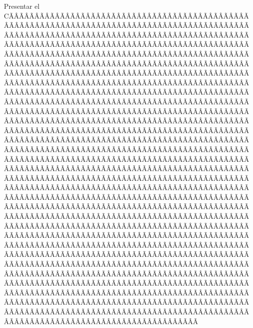 \begin{sumilla}
\begin{objetivosdelcurso}
\item  Presentar el CÃÂÃÂÃÂÃÂÃÂÃÂÃÂÃÂÃÂÃÂÃÂÃÂÃÂÃÂÃÂÃÂÃÂÃÂÃÂÃÂÃÂÃÂÃÂÃÂÃÂÃÂÃÂÃÂÃÂÃÂÃÂÃÂÃÂÃÂÃÂÃÂÃÂÃÂÃÂÃÂÃÂÃÂÃÂÃÂÃÂÃÂÃÂÃÂÃÂÃÂÃÂÃÂÃÂÃÂÃÂÃÂÃÂÃÂÃÂÃÂÃÂÃÂÃÂÃÂÃÂÃÂÃÂÃÂÃÂÃÂÃÂÃÂÃÂÃÂÃÂÃÂÃÂÃÂÃÂÃÂÃÂÃÂÃÂÃÂÃÂÃÂÃÂÃÂÃÂÃÂÃÂÃÂÃÂÃÂÃÂÃÂÃÂÃÂÃÂÃÂÃÂÃÂÃÂÃÂÃÂÃÂÃÂÃÂÃÂÃÂÃÂÃÂÃÂÃÂÃÂÃÂÃÂÃÂÃÂÃÂÃÂÃÂÃÂÃÂÃÂÃÂÃÂÃÂÃÂÃÂÃÂÃÂÃÂÃÂÃÂÃÂÃÂÃÂÃÂÃÂÃÂÃÂÃÂÃÂÃÂÃÂÃÂÃÂÃÂÃÂÃÂÃÂÃÂÃÂÃÂÃÂÃÂÃÂÃÂÃÂÃÂÃÂÃÂÃÂÃÂÃÂÃÂÃÂÃÂÃÂÃÂÃÂÃÂÃÂÃÂÃÂÃÂÃÂÃÂÃÂÃÂÃÂÃÂÃÂÃÂÃÂÃÂÃÂÃÂÃÂÃÂÃÂÃÂÃÂÃÂÃÂÃÂÃÂÃÂÃÂÃÂÃÂÃÂÃÂÃÂÃÂÃÂÃÂÃÂÃÂÃÂÃÂÃÂÃÂÃÂÃÂÃÂÃÂÃÂÃÂÃÂÃÂÃÂÃÂÃÂÃÂÃÂÃÂÃÂÃÂÃÂÃÂÃÂÃÂÃÂÃÂÃÂÃÂÃÂÃÂÃÂÃÂÃÂÃÂÃÂÃÂÃÂÃÂÃÂÃÂÃÂÃÂÃÂÃÂÃÂÃÂÃÂÃÂÃÂÃÂÃÂÃÂÃÂÃÂÃÂÃÂÃÂÃÂÃÂÃÂÃÂÃÂÃÂÃÂÃÂÃÂÃÂÃÂÃÂÃÂÃÂÃÂÃÂÃÂÃÂÃÂÃÂÃÂÃÂÃÂÃÂÃÂÃÂÃÂÃÂÃÂÃÂÃÂÃÂÃÂÃÂÃÂÃÂÃÂÃÂÃÂÃÂÃÂÃÂÃÂÃÂÃÂÃÂÃÂÃÂÃÂÃÂÃÂÃÂÃÂÃÂÃÂÃÂÃÂÃÂÃÂÃÂÃÂÃÂÃÂÃÂÃÂÃÂÃÂÃÂÃÂÃÂÃÂÃÂÃÂÃÂÃÂÃÂÃÂÃÂÃÂÃÂÃÂÃÂÃÂÃÂÃÂÃÂÃÂÃÂÃÂÃÂÃÂÃÂÃÂÃÂÃÂÃÂÃÂÃÂÃÂÃÂÃÂÃÂÃÂÃÂÃÂÃÂÃÂÃÂÃÂÃÂÃÂÃÂÃÂÃÂÃÂÃÂÃÂÃÂÃÂÃÂÃÂÃÂÃÂÃÂÃÂÃÂÃÂÃÂÃÂÃÂÃÂÃÂÃÂÃÂÃÂÃÂÃÂÃÂÃÂÃÂÃÂÃÂÃÂÃÂÃÂÃÂÃÂÃÂÃÂÃÂÃÂÃÂÃÂÃÂÃÂÃÂÃÂÃÂÃÂÃÂÃÂÃÂÃÂÃÂÃÂÃÂÃÂÃÂÃÂÃÂÃÂÃÂÃÂÃÂÃÂÃÂÃÂÃÂÃÂÃÂÃÂÃÂÃÂÃÂÃÂÃÂÃÂÃÂÃÂÃÂÃÂÃÂÃÂÃÂÃÂÃÂÃÂÃÂÃÂÃÂÃÂÃÂÃÂÃÂÃÂÃÂÃÂÃÂÃÂÃÂÃÂÃÂÃÂÃÂÃÂÃÂÃÂÃÂÃÂÃÂÃÂÃÂÃÂÃÂÃÂÃÂÃÂÃÂÃÂÃÂÃÂÃÂÃÂÃÂÃÂÃÂÃÂÃÂÃÂÃÂÃÂÃÂÃÂÃÂÃÂÃÂÃÂÃÂÃÂÃÂÃÂÃÂÃÂÃÂÃÂÃÂÃÂÃÂÃÂÃÂÃÂÃÂÃÂÃÂÃÂÃÂÃÂÃÂÃÂÃÂÃÂÃÂÃÂÃÂÃÂÃÂÃÂÃÂÃÂÃÂÃÂÃÂÃÂÃÂÃÂÃÂÃÂÃÂÃÂÃÂÃÂÃÂÃÂÃÂÃÂÃÂÃÂÃÂÃÂÃÂÃÂÃÂÃÂÃÂÃÂÃÂÃÂÃÂÃÂÃÂÃÂÃÂÃÂÃÂÃÂÃÂÃÂÃÂÃÂÃÂÃÂÃÂÃÂÃÂÃÂÃÂÃÂÃÂÃÂÃÂÃÂÃÂÃÂÃÂÃÂÃÂÃÂÃÂÃÂÃÂÃÂÃÂÃÂÃÂÃÂÃÂÃÂÃÂÃÂÃÂÃÂÃÂÃÂÃÂÃÂÃÂÃÂÃÂÃÂÃÂÃÂÃÂÃÂÃÂÃÂÃÂÃÂÃÂÃÂÃÂÃÂÃÂÃÂÃÂÃÂÃÂÃÂÃÂÃÂÃÂÃÂÃÂÃÂÃÂÃÂÃÂÃÂÃÂÃÂÃÂÃÂÃÂÃÂÃÂÃÂÃÂÃÂÃÂÃÂÃÂÃÂÃÂÃÂÃÂÃÂÃÂÃÂÃÂÃÂÃÂÃÂÃÂÃÂÃÂÃÂÃÂÃÂÃÂÃÂÃÂÃÂÃÂÃÂÃÂÃÂÃÂÃÂÃÂÃÂÃÂÃÂÃÂÃÂÃÂÃÂÃÂÃÂÃÂÃÂÃÂÃÂÃÂÃÂÃÂÃÂÃÂÃÂÃÂÃÂÃÂÃÂÃÂÃÂÃÂÃÂÃÂÃÂÃÂÃÂÃÂÃÂÃÂÃÂÃÂÃÂÃÂÃÂÃÂÃÂÃÂÃÂÃÂÃÂÃÂÃÂÃÂÃÂÃÂÃÂÃÂÃÂÃÂÃÂÃÂÃÂÃÂÃÂÃÂÃÂÃÂÃÂÃÂÃÂÃÂÃÂÃÂÃÂÃÂÃÂÃÂÃÂÃÂÃÂÃÂÃÂÃÂÃÂÃÂÃÂÃÂÃÂÃÂÃÂÃÂÃÂÃÂÃÂÃÂÃÂÃ
\end{objetivosdelcurso}
\end{sumilla}
